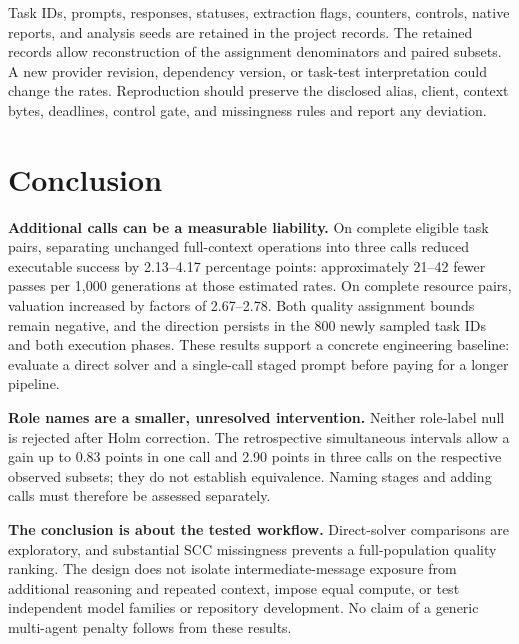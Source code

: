 Task IDs, prompts, responses, statuses, extraction flags, counters, controls, native reports, and analysis seeds are retained in the project records. The retained records allow reconstruction of the assignment denominators and paired subsets. A new provider revision, dependency version, or task-test interpretation could change the rates. Reproduction should preserve the disclosed alias, client, context bytes, deadlines, control gate, and missingness rules and report any deviation.

\section{Conclusion}
\textbf{Additional calls can be a measurable liability.} On complete eligible task pairs, separating unchanged full-context operations into three calls reduced executable success by 2.13--4.17 percentage points: approximately 21--42 fewer passes per 1,000 generations at those estimated rates. On complete resource pairs, valuation increased by factors of 2.67--2.78. Both quality assignment bounds remain negative, and the direction persists in the 800 newly sampled task IDs and both execution phases. These results support a concrete engineering baseline: evaluate a direct solver and a single-call staged prompt before paying for a longer pipeline.

\textbf{Role names are a smaller, unresolved intervention.} Neither role-label null is rejected after Holm correction. The retrospective simultaneous intervals allow a gain up to 0.83 points in one call and 2.90 points in three calls on the respective observed subsets; they do not establish equivalence. Naming stages and adding calls must therefore be assessed separately.

\textbf{The conclusion is about the tested workflow.} Direct-solver comparisons are exploratory, and substantial SCC missingness prevents a full-population quality ranking. The design does not isolate intermediate-message exposure from additional reasoning and repeated context, impose equal compute, or test independent model families or repository development. No claim of a generic multi-agent penalty follows from these results.

